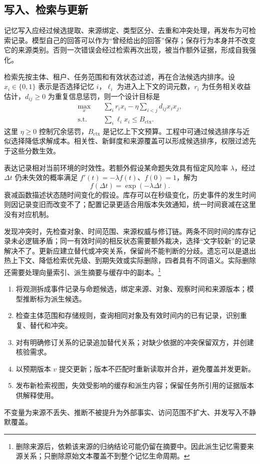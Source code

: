 \documentclass[../textbook.tex]{subfiles}
\begin{document}
\subsection{写入、检索与更新}
记忆写入应经过候选提取、来源绑定、类型区分、去重和冲突处理，再发布为可检索记录。模型自己的回答可以作为“曾经给出的回答”保存；保存行为本身并不改变它的来源类别。否则一次错误会经过检索再次出现，被当作额外证据，形成自我强化。

检索先按主体、租户、任务范围和有效状态过滤，再在合法候选内排序。设 $x_i\in\{0,1\}$ 表示是否选择记忆 $i$，$\ell_i$ 为进入上下文的词元数，$r_i$ 为任务相关收益估计，$d_{ij}\ge0$ 为重复信息惩罚，则一个设计目标是
\begin{equation}
 \begin{aligned}
  \max_x &\quad \sum_i r_ix_i-\eta\sum_{i<j}d_{ij}x_ix_j, \\
  \text{s.t.} &\quad \sum_i\ell_ix_i\le B_{\mathrm{ctx}}.
 \end{aligned}
\end{equation}
这里 $\eta\ge0$ 控制冗余惩罚，$B_{\mathrm{ctx}}$ 是记忆上下文预算。工程中可通过候选排序与近似选择降低求解成本。相关性、新鲜度和来源覆盖可以形成候选排序，权限过滤先于这些分数生效。

表达记录相对当前环境的时效性。若额外假设某命题失效具有恒定风险率 $\lambda$，经过 $\Delta t$ 仍未失效的概率满足 $f'(t)=-\lambda f(t)$、$f(0)=1$，解为
\begin{equation}
 f(\Delta t)=\exp(-\lambda\Delta t).
\end{equation}
衰减函数描述状态随时间变化的假设。库存可以在秒级变化，历史事件的发生时间则因记录变旧而改变不了；配置记录更适合用版本失效通知，统一时间衰减在这里没有对应机制。

发现冲突时，先检查对象、时间范围、来源权威与修订链。两条不同时间的库存记录未必逻辑矛盾；同一有效时间的相反状态需要额外裁决，选择“文字较新”的记录解决不了。更新应建立替代或冲突关系，保留尚不能判断的分歧。遗忘可以是退出热上下文、降低检索优先级、到期失效或实际删除，四者具有不同语义。实际删除还需要处理向量索引、派生摘要与缓存中的副本。\footnote{删除来源后，依赖该来源的归纳结论可能仍留在摘要中。因此派生记忆需要来源关系；只删除原始文本覆盖不到整个记忆生命周期。}

\begin{algorithm}[有来源的记忆更新]
\begin{enumerate}
\item 将观测拆成事件记录与命题候选，绑定来源、对象、观察时间和来源版本；模型推断标为派生候选。
\item 检查主体范围和存储规则，查询相同对象及有效时间内的已有记录，识别重复、替代和冲突。
\item 对有明确修订关系的记录追加替代关系；对缺少依据的冲突保留双方，并创建核验需求。
\item 以预期版本 $v$ 提交更新；版本不匹配时重新读取并合并，避免覆盖并发更新。
\item 发布新检索视图，失效受影响的缓存和派生内容；保留任务所引用的证据版本供解释使用。
\end{enumerate}
不变量为来源不丢失、推断不被提升为外部事实、访问范围不扩大、并发写入不静默覆盖。
\end{algorithm}
\end{document}
